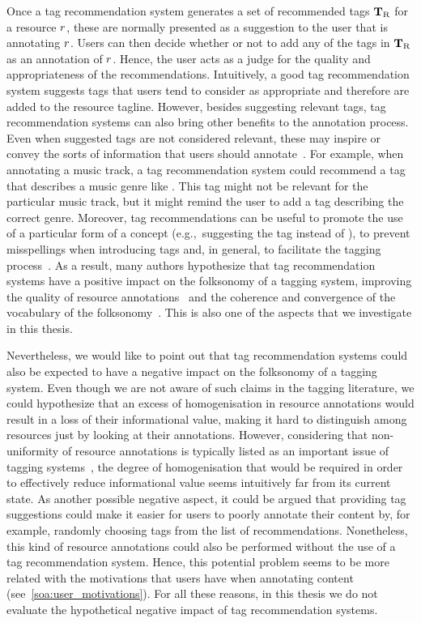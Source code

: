 Once a tag recommendation system generates a set of recommended tags $\mathbf{T}_{\text{R}}$ for a resource $r$, these are normally presented as a suggestion to the user that is annotating $r$. Users can then decide whether or not to add any of the tags in $\mathbf{T}_{\text{R}}$ as an annotation of $r$. Hence, the user acts as a judge for the quality and appropriateness of the recommendations.
Intuitively, a good tag recommendation system suggests tags that users tend to consider as appropriate and therefore are added to the resource tagline. However, besides suggesting relevant tags, tag recommendation systems can also bring other benefits to the annotation process. Even when suggested tags are not considered relevant, these may inspire or convey the sorts of information that users should annotate~\citep{Ames2007}. For example, when annotating a music track, a tag recommendation system could recommend a tag that describes a music genre like . This tag might not be relevant for the particular music track, but it might remind the user to add a tag describing the correct genre.
Moreover, tag recommendations can be useful to promote the use of a particular form of a concept (e.g.,~suggesting the tag  instead of ), to prevent misspellings when introducing tags and, in general, to facilitate the tagging process~\citep{Sood2007,jaske2007,Wang2012}.
As a result, many authors hypothesize that tag recommendation systems have a positive impact on the folksonomy of a tagging system, improving the quality of resource annotations~\citep{Jaschke2012,Wang2012} and the coherence and convergence of the vocabulary of the folksonomy~\citep{golder2006,marlow2006,jaske2007,Sood2007,Zangerle2011}. 
This is also one of the aspects that we investigate in this thesis.

Nevertheless, we would like to point out that tag recommendation systems could also be expected to have a negative impact on the folksonomy of a tagging system. Even though we are not aware of such claims in the tagging literature, we could hypothesize that an excess of homogenisation in resource annotations would result in a loss of their informational value, making it hard to distinguish among resources just by looking at their annotations. 
However, considering that non-uniformity of resource annotations is typically listed as an important issue of tagging systems~\citep{Spiteri2006}, the degree of homogenisation that would be required in order to effectively reduce informational value seems intuitively far from its current state.
As another possible negative aspect, it could be argued that providing tag suggestions could make it easier for users to poorly annotate their content by, for example, randomly choosing tags from the list of recommendations. Nonetheless, this kind of resource annotations could also be performed without the use of a tag recommendation system. Hence, this potential problem seems to be more related with the motivations that users have when annotating content (see~\ref{soa:user_motivations}).
For all these reasons, in this thesis we do not evaluate the hypothetical negative impact of tag recommendation systems. 


